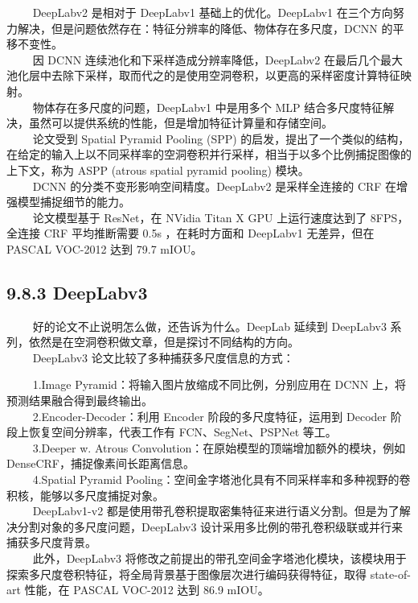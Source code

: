    DeepLabv2 是相对于 DeepLabv1 基础上的优化。DeepLabv1
在三个方向努力解决，但是问题依然存在：特征分辨率的降低、物体存在多尺度，DCNN
的平移不变性。\\
   因 DCNN 连续池化和下采样造成分辨率降低，DeepLabv2
在最后几个最大池化层中去除下采样，取而代之的是使用空洞卷积，以更高的采样密度计算特征映射。\\
   物体存在多尺度的问题，DeepLabv1 中是用多个 MLP
结合多尺度特征解决，虽然可以提供系统的性能，但是增加特征计算量和存储空间。\\
   论文受到 Spatial Pyramid Pooling (SPP)
的启发，提出了一个类似的结构，在给定的输入上以不同采样率的空洞卷积并行采样，相当于以多个比例捕捉图像的上下文，称为
ASPP (atrous spatial pyramid pooling) 模块。\\
   DCNN 的分类不变形影响空间精度。DeepLabv2 是采样全连接的 CRF
在增强模型捕捉细节的能力。\\
   论文模型基于 ResNet，在 NVidia Titan X GPU 上运行速度达到了
8FPS，全连接 CRF 平均推断需要 0.5s ，在耗时方面和 DeepLabv1 无差异，但在
PASCAL VOC-2012 达到 79.7 mIOU。

\subsection{9.8.3 DeepLabv3}\label{deeplabv3}

   好的论文不止说明怎么做，还告诉为什么。DeepLab 延续到 DeepLabv3
系列，依然是在空洞卷积做文章，但是探讨不同结构的方向。\\
   DeepLabv3 论文比较了多种捕获多尺度信息的方式：

\begin{figure}
\centering
\end{figure}

   1.Image Pyramid：将输入图片放缩成不同比例，分别应用在 DCNN
上，将预测结果融合得到最终输出。\\
   2.Encoder-Decoder：利用 Encoder 阶段的多尺度特征，运用到 Decoder
阶段上恢复空间分辨率，代表工作有 FCN、SegNet、PSPNet 等工。\\
   3.Deeper w. Atrous Convolution：在原始模型的顶端增加额外的模块，例如
DenseCRF，捕捉像素间长距离信息。\\
   4.Spatial Pyramid
Pooling：空间金字塔池化具有不同采样率和多种视野的卷积核，能够以多尺度捕捉对象。\\
   DeepLabv1-v2
都是使用带孔卷积提取密集特征来进行语义分割。但是为了解决分割对象的多尺度问题，DeepLabv3
设计采用多比例的带孔卷积级联或并行来捕获多尺度背景。\\
   此外，DeepLabv3
将修改之前提出的带孔空间金字塔池化模块，该模块用于探索多尺度卷积特征，将全局背景基于图像层次进行编码获得特征，取得
state-of-art 性能，在 PASCAL VOC-2012 达到 86.9 mIOU。

